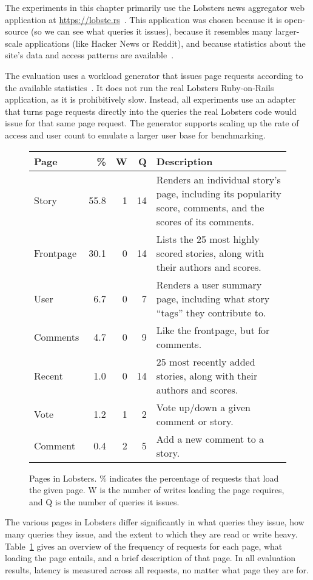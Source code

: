 The experiments in this chapter primarily use the Lobsters news
aggregator web application at \url{https://lobste.rs}~\cite{lobsters}. This
application was chosen because it is open-source (so we can see what queries it
issues), because it resembles many larger-scale applications (like Hacker News
or Reddit), and because statistics about the site's data and access patterns are
available~\cite{lobsters-data}.

The evaluation uses a workload generator that issues page requests
according to the available statistics~\cite{generator}. It does not run the
real Lobsters Ruby-on-Rails application, as it is prohibitively slow. Instead,
all experiments use an adapter that turns page requests directly into the
queries the real Lobsters code would issue for that same page request. The
generator supports scaling up the rate of access and user count to emulate a
larger user base for benchmarking.

\begin{figure}
  \begin{tabular}{ p{0.8in} | r | r | r | p{2.9in} }
    Page & \% & W & Q & Description \\
    \hline
    Story & 55.8 & 1 & 14 & Renders an individual story's page, including its
    popularity score, comments, and the scores of its comments.\\
    Frontpage & 30.1 & 0 & 14 & Lists the 25 most highly scored stories, along
    with their authors and scores.\\
    User & 6.7 & 0 & 7 & Renders a user summary page, including what story
    ``tags'' they contribute to.\\
    Comments & 4.7 & 0 & 9 & Like the frontpage, but for comments.\\
    Recent & 1.0 & 0 & 14 & 25 most recently added stories, along with their
    authors and scores.\\
    Vote & 1.2 & 1 & 2 & Vote up/down a given comment or story.\\
    Comment & 0.4 & 2 & 5 & Add a new comment to a story.\\
  \end{tabular}
  \caption{Pages in Lobsters. \% indicates the percentage of requests that load
  the given page. W is the number of writes loading the page requires, and Q is
  the number of queries it issues.}
  \label{t:lobsters-pages}
\end{figure}

The various pages in Lobsters differ significantly in what queries they issue,
how many queries they issue, and the extent to which they are read or write
heavy. Table~\ref{t:lobsters-pages} gives an overview of the frequency of
requests for each page, what loading the page entails, and a brief description
of that page. In all evaluation results, latency is measured across all
requests, no matter what page they are for.

